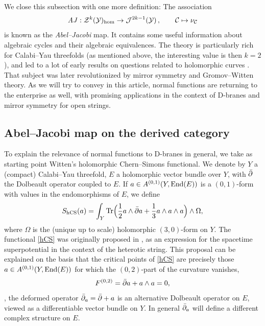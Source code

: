 We close this subsection with one more definition: The association 
\begin{equation}
\eqlabel{abeljacobi}
\AJ:\calz^k(\caly)_{\rm hom}\to \calj^{2k-1}(\caly)\,,\qquad \calc\mapsto\nu_\calc
\end{equation}
is known as the {\it Abel--Jacobi} map. It contains some useful 
information about algebraic cycles and their algebraic equivalences. 
The theory is particularly rich for Calabi--Yau threefolds (as mentioned
above, the interesting value is then $k=2$), and led to a lot
of early results on questions related to holomorphic curves 
\cite{griffiths1,clemensinf,voisininf}. That subject was later 
revolutionized by mirror symmetry and Gromov--Witten theory. As 
we will try to convey in this article, normal functions are returning
to the enterprise as well, with promising applications in the context 
of D-branes and mirror symmetry for open strings.



\subsection{Abel--Jacobi map on the derived category}

To explain the relevance of normal functions to D-branes in general,
we take as starting point Witten's holomorphic Chern--Simons
functional. We denote by $Y$ a (compact) Calabi--Yau threefold, 
$E$ a holomorphic vector bundle over $Y$, with $\bar\partial$ the
Dolbeault operator coupled to $E$. If $a\in A^{(0,1)}(Y,\mathop{\rm End}(E))$
is a $(0,1)$-form with values in the endomorphisms of $E$, we define
\begin{equation}
\eqlabel{hCS}
S_{\rm hCS}(a)= \int_Y 
\tr \Bigl(\frac 12 a\wedge\delbar a + \frac 13 a\wedge a\wedge a\Bigr)
\wedge\Omega ,
\end{equation}
where $\Omega$ is the (unique up to scale) holomorphic $(3,0)$-form
on $Y$. The functional \eqref{hCS} was originally proposed in 
\cite{wittenissues}, as an expression for the spacetime superpotential 
in the context of the heterotic string. This proposal can be explained 
on the basis that the critical points of \eqref{hCS} are precisely those 
$a\in A^{(0,1)}(Y,\mathop{\rm End}(E))$ for which the $(0,2)$-part of the curvature 
vanishes,
\begin{equation}
F^{(0,2)} = \bar\partial a + a\wedge a = 0 ,
\end{equation}
\ie, the deformed operator $\bar\partial_a=\bar\partial+a$ is an alternative
Dolbeault operator on $E$, viewed as a differentiable vector bundle
on $Y$. In general $\bar\partial_a$ will define a different complex
structure on $E$.

